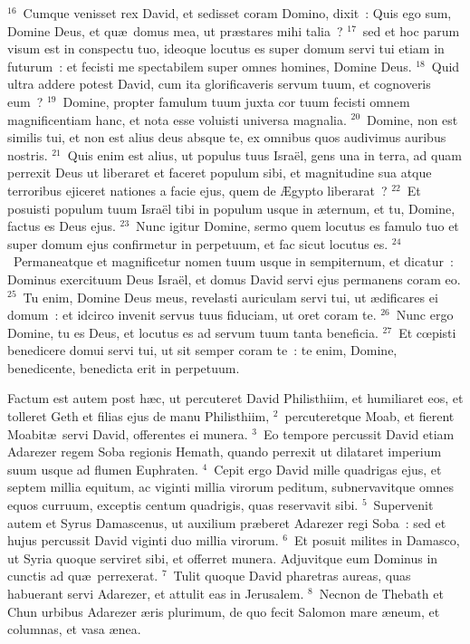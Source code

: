 ${}^{16}$~Cumque venisset rex David, et sedisset coram Domino, dixit~: Quis ego sum, Domine Deus, et qu\ae\ domus mea, ut pr\ae stares mihi talia~?
${}^{17}$~sed et hoc parum visum est in conspectu tuo, ideoque locutus es super domum servi tui etiam in futurum~: et fecisti me spectabilem super omnes homines, Domine Deus.
${}^{18}$~Quid ultra addere potest David, cum ita glorificaveris servum tuum, et cognoveris eum~?
${}^{19}$~Domine, propter famulum tuum juxta cor tuum fecisti omnem magnificentiam hanc, et nota esse voluisti universa magnalia.
${}^{20}$~Domine, non est similis tui, et non est alius deus absque te, ex omnibus quos audivimus auribus nostris.
${}^{21}$~Quis enim est alius, ut populus tuus Isra\"el, gens una in terra, ad quam perrexit Deus ut liberaret et faceret populum sibi, et magnitudine sua atque terroribus ejiceret nationes a facie ejus, quem de \AE gypto liberarat~?
${}^{22}$~Et posuisti populum tuum Isra\"el tibi in populum usque in \ae ternum, et tu, Domine, factus es Deus ejus.
${}^{23}$~Nunc igitur Domine, sermo quem locutus es famulo tuo et super domum ejus confirmetur in perpetuum, et fac sicut locutus es.
${}^{24}$~Permaneatque et magnificetur nomen tuum usque in sempiternum, et dicatur~: Dominus exercituum Deus Isra\"el, et domus David servi ejus permanens coram eo.
${}^{25}$~Tu enim, Domine Deus meus, revelasti auriculam servi tui, ut \ae dificares ei domum~: et idcirco invenit servus tuus fiduciam, ut oret coram te.
${}^{26}$~Nunc ergo Domine, tu es Deus, et locutus es ad servum tuum tanta beneficia.
${}^{27}$~Et cœpisti benedicere domui servi tui, ut sit semper coram te~: te enim, Domine, benedicente, benedicta erit in perpetuum.

\lettrine[lines=3,image=true,loversize=0.05,lraise=-0.03]{F}{}actum est autem post h\ae c, ut percuteret David Philisthiim, et humiliaret eos, et tolleret Geth et filias ejus de manu Philisthiim,
${}^{2}$~percuteretque Moab, et fierent Moabit\ae\ servi David, offerentes ei munera.
${}^{3}$~Eo tempore percussit David etiam Adarezer regem Soba regionis Hemath, quando perrexit ut dilataret imperium suum usque ad flumen Euphraten.
${}^{4}$~Cepit ergo David mille quadrigas ejus, et septem millia equitum, ac viginti millia virorum peditum, subnervavitque omnes equos curruum, exceptis centum quadrigis, quas reservavit sibi.
${}^{5}$~Supervenit autem et Syrus Damascenus, ut auxilium pr\ae beret Adarezer regi Soba~: sed et hujus percussit David viginti duo millia virorum.
${}^{6}$~Et posuit milites in Damasco, ut Syria quoque serviret sibi, et offerret munera. Adjuvitque eum Dominus in cunctis ad qu\ae\ perrexerat.
${}^{7}$~Tulit quoque David pharetras aureas, quas habuerant servi Adarezer, et attulit eas in Jerusalem.
${}^{8}$~Necnon de Thebath et Chun urbibus Adarezer \ae ris plurimum, de quo fecit Salomon mare \ae neum, et columnas, et vasa \ae nea.


